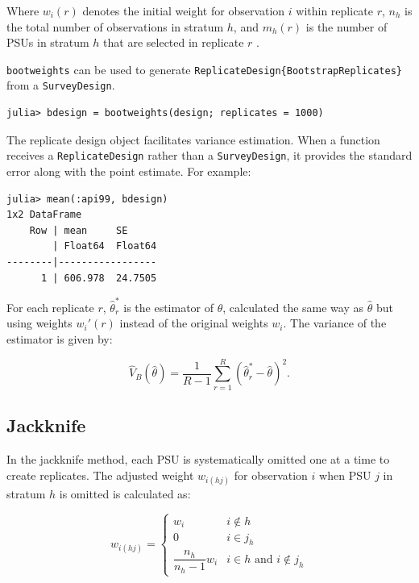 \documentclass{article}
\begin{document}
Where \( w_i(r) \) denotes the initial weight for observation \( i \) within replicate \( r \), \( n_h \) is the total number of observations in stratum \( h \), and \( m_{h}(r) \) is the number of PSUs in stratum \( h \) that are selected in replicate \( r \) \cite{Lohr}.

\verb|bootweights| can be used to generate \verb|ReplicateDesign{BootstrapReplicates}| from a \verb|SurveyDesign|. 

\begin{verbatim}
julia> bdesign = bootweights(design; replicates = 1000)
\end{verbatim}

The replicate design object facilitates variance estimation. When a function receives a \verb|ReplicateDesign| rather than a \verb|SurveyDesign|, it provides the standard error along with the point estimate.
For example: 
\begin{verbatim}
julia> mean(:api99, bdesign)
1x2 DataFrame
    Row | mean     SE      
        | Float64  Float64 
--------|-----------------
      1 | 606.978  24.7505
    \end{verbatim}
For each replicate $r$, $\hat{\theta}^*_r$ is the estimator of $\theta$, calculated the same way as $\hat{\theta}$ but using weights $w_i'(r)$ instead of the original weights $w_i$. The variance of the estimator is given by: 

\begin{equation}
        \hat{V}_B(\hat{\theta}) = \dfrac{1}{R-1}\sum_{r=1}^{R} (\hat{\theta}^*_r - \hat{\theta})^2.
\end{equation}


\subsection{Jackknife}
In the jackknife method, each PSU is systematically omitted one at a time to create replicates. The adjusted weight \( w_{i(hj)} \) for observation \( i \) when PSU \( j \) in stratum \( h \) is omitted is calculated as:

\begin{equation}
    w_{i(hj)} = \begin{cases}
        w_i & i \notin h\\
    0 & i \in j_{h} \\
    \dfrac{n_h}{n_h - 1} w_i &  i \in h \text{ and } i \notin j_{h}
    \end{cases} 
    \end{equation} \cite{Lohr}
\end{document}
